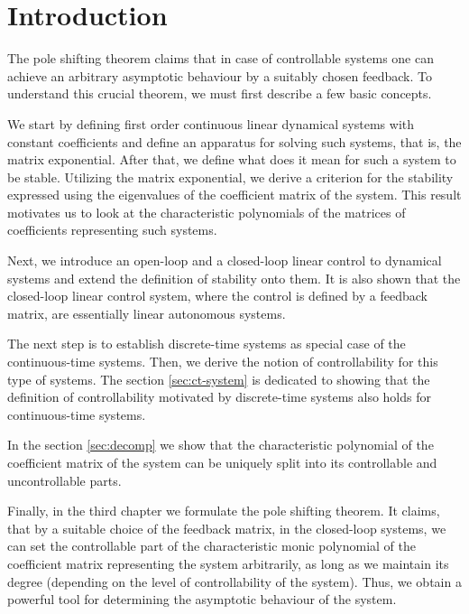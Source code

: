 \chapter*{Introduction}

The pole shifting theorem claims that in case of controllable systems one can achieve an arbitrary asymptotic behaviour by a suitably chosen feedback. To understand this crucial theorem, we must first describe a few basic concepts. 

We start by defining first order continuous linear dynamical systems with constant coefficients and define an apparatus for solving such systems, that is, the matrix exponential. After that, we define what does it mean for such a system to be stable. Utilizing the matrix exponential, we derive a criterion for the stability expressed using the eigenvalues of the coefficient matrix of the system. This result motivates us to look at the characteristic polynomials of the matrices of coefficients representing such systems. 

Next, we introduce an open-loop and a closed-loop linear control to dynamical systems and extend the definition of stability onto them. It is also shown that the closed-loop linear control system, where the control is defined by a feedback matrix, are essentially linear autonomous systems. 

The next step is to establish discrete-time systems as special case of the continuous-time systems. Then, we derive the notion of controllability for this type of systems. The section \ref{sec:ct-system} is dedicated to showing that the definition of controllability motivated by discrete-time systems also holds for continuous-time systems.

In the section \ref{sec:decomp} we show that the characteristic polynomial of the coefficient matrix of the system can be uniquely split into its controllable and uncontrollable parts. 

Finally, in the third chapter we formulate the pole shifting theorem. It claims, that by a suitable choice of the feedback matrix, in the closed-loop systems, we can set the controllable part of the characteristic monic polynomial of the coefficient matrix representing the system arbitrarily, as long as we maintain its degree (depending on the level of controllability of the system). Thus, we obtain a powerful tool for determining the asymptotic behaviour of the system.